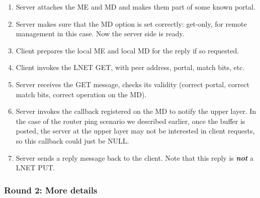 \begin{enumerate}

\item Server attaches the ME and MD and makes them part of some known
portal.

\item Server makes sure that the MD option is set correctly: get-only, for remote management
in this case. Now the server side is ready.

\item Client prepares the local ME and local MD for the reply if so requested.

\item Client invokes the LNET GET, with peer address, portal, match bits, etc.

\item Server receives the GET message, checks its validity (correct portal, correct
match bits, correct operation on the MD).

\item Server invokes the callback registered on the MD to notify the upper
layer. In the case of the router ping scenario we described earlier, once the
buffer is posted, the server at the upper layer may not be interested in client
requests, so this callback could just be NULL.

\item Server sends a reply message back to the client. Note that this
reply is \textbf{\textit{not}} a LNET PUT.

\end{enumerate}


\subsubsection{Round 2: More details}

